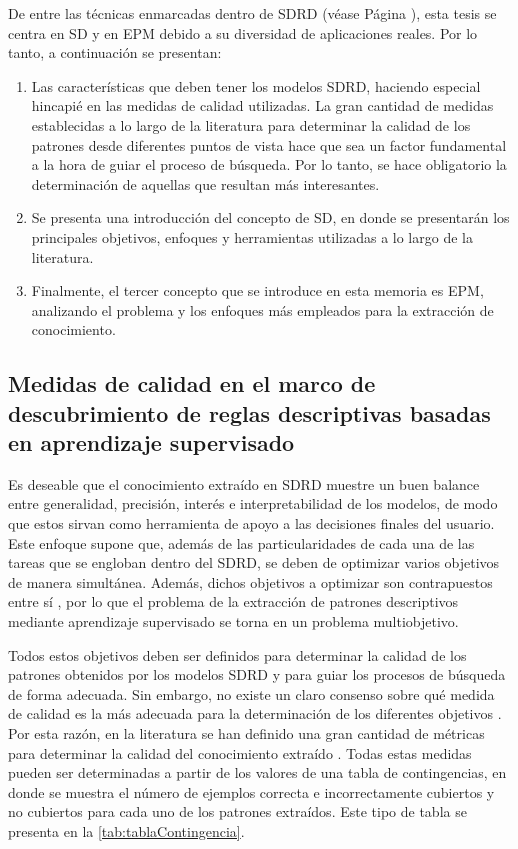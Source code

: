 \documentclass[c5paper,10pt,twoside]{book}	   	%
\begin{document}
De entre las técnicas enmarcadas dentro de \ac{SDRD} (véase Página \pageref{it:sdrd_tasks}), esta tesis se centra en \ac{SD} y en \ac{EPM} debido a su diversidad de aplicaciones reales. Por lo tanto, a continuación se presentan:

\begin{enumerate}
	\item Las características que deben tener los modelos \ac{SDRD}, haciendo especial hincapié en las medidas de calidad utilizadas. La gran cantidad de medidas establecidas a lo largo de la literatura para determinar la calidad de los patrones desde diferentes puntos de vista hace que sea un factor fundamental a la hora de guiar el proceso de búsqueda. Por lo tanto, se hace obligatorio la determinación de aquellas que resultan más interesantes. 

	\item Se presenta una introducción del concepto de \ac{SD}, en donde se presentarán los principales objetivos, enfoques y herramientas utilizadas a lo largo de la literatura.
	
	\item Finalmente, el tercer concepto que se introduce en esta memoria es \ac{EPM}, analizando el problema y los enfoques más empleados para la extracción de conocimiento.
\end{enumerate}




\subsection{Medidas de calidad en el marco de descubrimiento de reglas descriptivas basadas en aprendizaje supervisado}

Es deseable que el conocimiento extraído en \ac{SDRD} muestre un buen balance entre generalidad, precisión, interés e interpretabilidad de los modelos, de modo que estos sirvan como herramienta de apoyo a las decisiones finales del usuario. Este enfoque supone que, además de las particularidades de cada una de las tareas que se engloban dentro del \ac{SDRD}, se deben de optimizar varios objetivos de manera simultánea. Además, dichos objetivos a optimizar son contrapuestos entre sí \cite{Bg94}, por lo que el problema de la extracción de patrones descriptivos mediante aprendizaje supervisado se torna en un problema multiobjetivo.

Todos estos objetivos deben ser definidos para determinar la calidad de los patrones obtenidos por los modelos \ac{SDRD} y para guiar los procesos de búsqueda de forma adecuada. Sin embargo, no existe un claro consenso sobre qué medida de calidad es la más adecuada para la determinación de los diferentes objetivos \cite{Cgdh14}. Por esta razón, en la literatura se han definido una gran cantidad de métricas para determinar la calidad del conocimiento extraído \cite{Lmcg16,Glmc17}. Todas estas medidas pueden ser determinadas a partir de los valores de una tabla de contingencias, en donde se muestra el número de ejemplos correcta e incorrectamente cubiertos y no cubiertos para cada uno de los patrones extraídos. Este tipo de tabla se presenta en la \cref{tab:tablaContingencia}.
\end{document}
